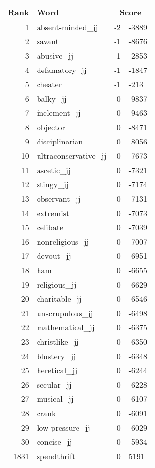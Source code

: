 \begin{longtable}[!htbp]{| rlr@{.}l |}
    \hline
    \textbf{Rank} & \textbf{Word} & \multicolumn{2}{c|}{\textbf{Score}} \\
    \hline
    \endhead
    1 & absent-minded\_jj & -2 & -3889 \\
    2 & savant & -1 & -8676 \\
    3 & abusive\_jj & -1 & -2853 \\
    4 & defamatory\_jj & -1 & -1847 \\
    5 & cheater & -1 & -213 \\
    6 & balky\_jj & 0 & -9837 \\
    7 & inclement\_jj & 0 & -9463 \\
    8 & objector & 0 & -8471 \\
    9 & disciplinarian & 0 & -8056 \\
    10 & ultraconservative\_jj & 0 & -7673 \\
    11 & ascetic\_jj & 0 & -7321 \\
    12 & stingy\_jj & 0 & -7174 \\
    13 & observant\_jj & 0 & -7131 \\
    14 & extremist & 0 & -7073 \\
    15 & celibate & 0 & -7039 \\
    16 & nonreligious\_jj & 0 & -7007 \\
    17 & devout\_jj & 0 & -6951 \\
    18 & ham & 0 & -6655 \\
    19 & religious\_jj & 0 & -6629 \\
    20 & charitable\_jj & 0 & -6546 \\
    21 & unscrupulous\_jj & 0 & -6498 \\
    22 & mathematical\_jj & 0 & -6375 \\
    23 & christlike\_jj & 0 & -6350 \\
    24 & blustery\_jj & 0 & -6348 \\
    25 & heretical\_jj & 0 & -6244 \\
    26 & secular\_jj & 0 & -6228 \\
    27 & musical\_jj & 0 & -6107 \\
    28 & crank & 0 & -6091 \\
    29 & low-pressure\_jj & 0 & -6029 \\
    30 & concise\_jj & 0 & -5934 \\
    1831 & spendthrift & 0 & 5191 \\

\end{longtable}
